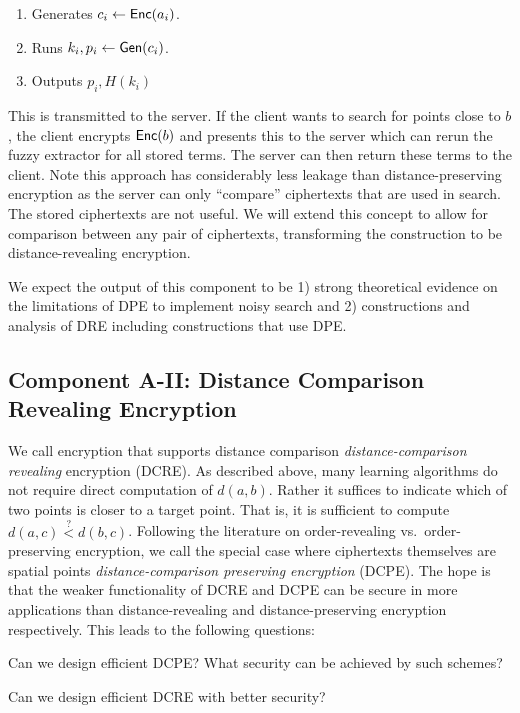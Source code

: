 \begin{enumerate}
\item Generates $c_i \leftarrow \mathsf{Enc}(a_i)$.
\item Runs $k_i, p_i \leftarrow \mathsf{Gen}(c_i)$.
\item Outputs $p_i, H(k_i)$
\end{enumerate}

This is transmitted to the server.  If the client wants to search for points close to $b$, the client encrypts $\mathsf{Enc}(b)$ and presents this to the server which can rerun the fuzzy extractor for all stored terms.  The server can then return these terms to the client.  Note this approach has considerably less leakage than distance-preserving encryption as the server can only ``compare'' ciphertexts that are used in search.  The stored ciphertexts are not useful.  We will extend this concept to allow for comparison between any pair of ciphertexts, transforming the construction to be distance-revealing encryption.

We expect the output of this component to be 1) strong theoretical evidence on the limitations of DPE to implement noisy search and 2) constructions and analysis of DRE including constructions that use DPE.  

\subsection{Component A-II: Distance Comparison Revealing Encryption}
We call encryption that supports distance comparison \emph{distance-comparison revealing} encryption (DCRE).  As described above, many learning algorithms do not require direct computation of $d(a,b)$.  Rather it suffices to indicate which of two points is closer to a target point.  That is, it is sufficient to compute $d(a,c)\overset{?}<d(b,c)$.  Following the literature on order-revealing vs.~order-preserving encryption, we call the special case where ciphertexts themselves are spatial points \emph{distance-comparison preserving encryption} (DCPE).  The hope is that the weaker functionality of DCRE and DCPE can be secure in more applications than distance-revealing and distance-preserving encryption respectively.
This leads to the following questions:

\begin{question}
Can we design efficient DCPE?  What security can be achieved by such schemes?
\end{question}

\begin{question}
Can we design efficient DCRE with better security?
\end{question}


